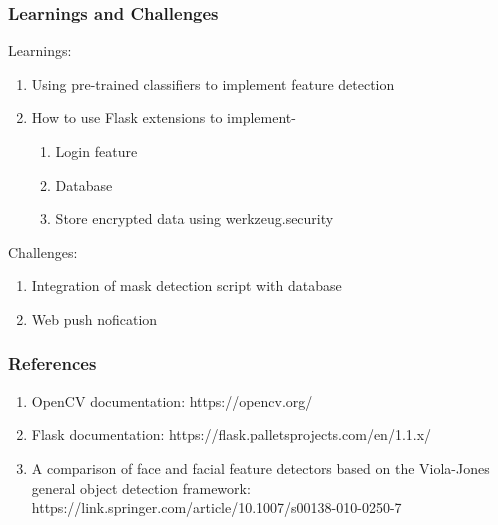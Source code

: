 \documentclass[14pt]{beamer}
\begin{document}
\begin{frame}
    \frametitle{Learnings and Challenges}
    Learnings:
    \begin{enumerate}
        \item Using pre-trained classifiers to implement feature detection
        \item How to use Flask extensions to implement-
        \begin{enumerate}
            \item Login feature
            \item Database
            \item Store encrypted data using werkzeug.security
        \end{enumerate}
    \end{enumerate}
    Challenges:
    \begin{enumerate}
        \item Integration of mask detection script with database
        \item Web push nofication
    \end{enumerate}
\end{frame}

\begin{frame}
    \frametitle{References}
    \begin{enumerate}
        \item OpenCV documentation: https://opencv.org/
        \item Flask documentation: https://flask.palletsprojects.com/en/1.1.x/
        \item A comparison of face and facial feature detectors based on the Viola-Jones general object detection framework: https://link.springer.com/article/10.1007/s00138-010-0250-7
    \end{enumerate}
\end{frame}
\end{document}

